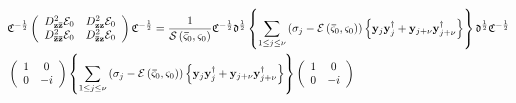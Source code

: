 \documentclass[aps,preprint]{revtex4}%
\begin{document}
\begin{align}
& \mathfrak{C}^{-\frac{1}{2}}\left(
\begin{array}
[c]{cc}%
D_{\mathbf{z\bar{z}}}^{2}\mathcal{E}_{0} & D_{\mathbf{zz}}^{2}\mathcal{E}%
_{0}\\
D_{\mathbf{\bar{z}\bar{z}}}^{2}\mathcal{E}_{0} & D_{\mathbf{\bar{z}z}}%
^{2}\mathcal{E}_{0}%
\end{array}
\right)  \mathfrak{C}^{-\frac{1}{2}}=\frac{1}{\mathcal{S}\left(
\mathbf{\bar{\varsigma}}_{0},\mathbf{\varsigma}_{0}\right)  }\mathfrak{C}%
^{-\frac{1}{2}}\mathfrak{\Delta}^{\frac{1}{2}}\left\{  \sum_{1\leq j\leq\nu
}\left(  \sigma_{j}-\mathcal{E}\left(  \mathbf{\bar{\varsigma}}_{0}%
,\mathbf{\varsigma}_{0}\right)  \right)  \left\{  \mathbf{y}_{j}\mathbf{y}%
_{j}^{\dagger}+\mathbf{y}_{j+\nu}\mathbf{y}_{j+\nu}^{\dagger}\right\}
\right\}  \mathfrak{\Delta}^{\frac{1}{2}}\mathfrak{C}^{-\frac{1}{2}}\\
& \left(
\begin{array}
[c]{cc}%
1 & 0\\
0 & -i
\end{array}
\right)  \left\{  \sum_{1\leq j\leq\nu}\left(  \sigma_{j}-\mathcal{E}\left(
\mathbf{\bar{\varsigma}}_{0},\mathbf{\varsigma}_{0}\right)  \right)  \left\{
\mathbf{y}_{j}\mathbf{y}_{j}^{\dagger}+\mathbf{y}_{j+\nu}\mathbf{y}_{j+\nu
}^{\dagger}\right\}  \right\}  \left(
\begin{array}
[c]{cc}%
1 & 0\\
0 & -i
\end{array}
\right)
\end{align}
\end{document}
